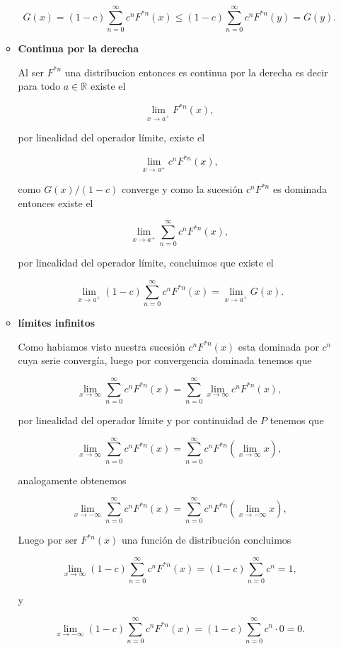 \documentclass[letterpaper]{article}
\theoremstyle{definition}
\theoremstyle{lemathm}
\theoremstyle{lemademthm}
\newcommand{\limxinf}{\lim_{x\to\infty}}
\newcommand{\RR}{\mathbb{R}}
\newcommand{\1}{\mathbbm{1}}
\begin{document}
\begin{enumerate}
\begin{itemize}
			\[G(x) = (1-c)\sum_{n=0}^{\infty} c^nF^{*n}(x) \leq (1-c)\sum_{n=0}^{\infty} c^nF^{*n}(y) = G(y).\]

			\item \textbf{Continua por la derecha}
			
			Al ser $F^{*n}$ una distribucion entonces es continua por la derecha es decir para todo $a \in \RR$ existe el

			\[\lim_{x\to a^+} F^{*n}(x),\]

			por linealidad del operador límite, existe el

			\[\lim_{x\to a^+} c^nF^{*n}(x),\]

			como $G(x)/(1-c)$ converge y como la sucesión $c^nF^{*n}$ es dominada entonces existe el

			\[\lim_{x\to a^+} \sum_{n=0}^{\infty} c^nF^{*n}(x),\]

			por linealidad del operador límite, concluimos que existe el

			\[\lim_{x\to a^+} (1-c)\sum_{n=0}^{\infty} c^nF^{*n}(x) = \lim_{x\to a^+} G(x).\]

			\item \textbf{límites infinitos}
			
			Como habiamos visto nuestra sucesión $c^nF^{*n}(x)$ esta dominada por $c^n$ cuya serie convergía, luego por convergencia dominada tenemos que

			\[\limxinf \sum_{n=0}^{\infty} c^nF^{*n}(x) = \sum_{n=0}^{\infty} \limxinf c^nF^{*n}(x),\]

			por linealidad del operador límite y por continuidad de $P$ tenemos que

			\[\limxinf \sum_{n=0}^{\infty} c^nF^{*n}(x) = \sum_{n=0}^{\infty}  c^nF^{*n}(\limxinf x),\]

			analogamente obtenemos

			\[\lim_{x\to-\infty} \sum_{n=0}^{\infty} c^nF^{*n}(x) = \sum_{n=0}^{\infty}  c^nF^{*n}(\lim_{x\to-\infty} x),\]

			Luego por ser $F^{*n}(x)$ una función de distribución concluimos

			\[\limxinf (1-c)\sum_{n=0}^{\infty} c^nF^{*n}(x) = (1-c)\sum_{n=0}^{\infty}  c^n = 1,\]

			y

			\[\lim_{x\to-\infty} (1-c)\sum_{n=0}^{\infty} c^nF^{*n}(x) = (1-c)\sum_{n=0}^{\infty}  c^n\cdot0 = 0.\]
			
		\end{itemize}

		\newpage


\end{enumerate}
\end{document}
